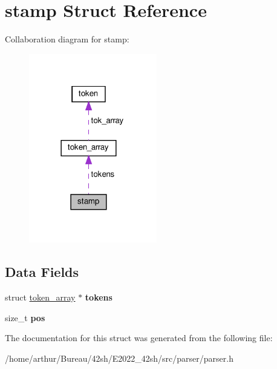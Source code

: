 \hypertarget{structstamp}{}\section{stamp Struct Reference}
\label{structstamp}


Collaboration diagram for stamp\+:
\nopagebreak
\begin{figure}[H]
\begin{center}
\leavevmode
\includegraphics[width=158pt]{structstamp__coll__graph}
\end{center}
\end{figure}
\subsection*{Data Fields}
\begin{DoxyCompactItemize}
\item 
\mbox{\label{structstamp_aaef3e57c04a4627439d4572e7c865246}} 
struct \hyperlink{structtoken__array}{token\+\_\+array} $\ast$ {\bfseries tokens}
\item 
\mbox{\label{structstamp_a5438a597ee291f523ae04a9fe355924f}} 
size\+\_\+t {\bfseries pos}
\end{DoxyCompactItemize}


The documentation for this struct was generated from the following file\+:\begin{DoxyCompactItemize}
\item 
/home/arthur/\+Bureau/42sh/\+E2022\+\_\+42sh/src/parser/parser.\+h\end{DoxyCompactItemize}

